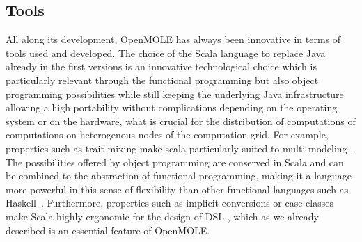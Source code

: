 \documentclass[10pt]{article}
\begin{document}
\subsection{Tools}


All along its development, OpenMOLE has always been innovative in terms of tools used and developed. The choice of the Scala language to replace Java already in the first versions is an innovative technological choice which is particularly relevant through the functional programming but also object programming possibilities while still keeping the underlying Java infrastructure allowing a high portability without complications depending on the operating system or on the hardware, what is crucial for the distribution of computations of computations on heterogenous nodes of the computation grid. For example, properties such as trait mixing make scala particularly suited to multi-modeling \citep{odersky2005scalable}. The possibilities offered by object programming are conserved in Scala and can be combined to the abstraction of functional programming, making it a language more powerful in this sense of flexibility than other functional languages such as Haskell~\citep{oliveira2010scala}. Furthermore, properties such as implicit conversions or case classes make Scala highly ergonomic for the design of DSL \citep{sloane2008experiences}, which as we already described is an essential feature of OpenMOLE.
\end{document}
